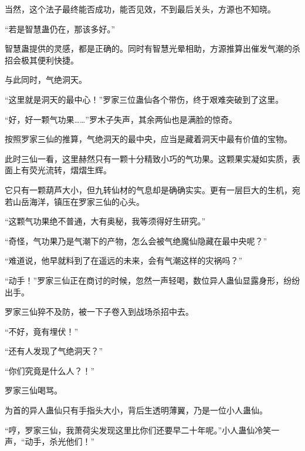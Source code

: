 \begin{this_body}
当然，这个法子最终能否成功，能否见效，不到最后关头，方源也不知晓。

“若是智慧蛊仍在，那该多好。”

智慧蛊提供的灵感，都是正确的。同时有智慧光晕相助，方源推算出催发气潮的杀招会极其便利快捷。

与此同时，气绝洞天。

“这里就是洞天的最中心！”罗家三位蛊仙各个带伤，终于艰难突破到了这里。

“好，好一颗气功果……”罗木子失声，其余两仙也是满脸的惊奇。

按照罗家三仙的推算，气绝洞天的最中央，应当是藏着洞天中最有价值的宝物。

此时三仙一看，这里赫然只有一颗十分精致小巧的气功果。这颗果实凝如实质，表面上有荧光流转，熠熠生辉。

它只有一颗葫芦大小，但九转仙材的气息却是确确实实。更有一层巨大的生机，宛若山岳海洋，镇压在罗家三仙的心头。

“这颗气功果绝不普通，大有奥秘，我等须得好生研究。”

“奇怪，气功果乃是气潮下的产物，怎么会被气绝魔仙隐藏在最中央呢？”

“难道说，他早就料到了在遥远的未来，会有气潮这样的灾祸吗？”

“动手！”罗家三仙正在商讨的时候，忽然一声轻喝，数位异人蛊仙显露身形，纷纷出手。

罗家三仙猝不及防，被一下子卷入到战场杀招中去。

“不好，竟有埋伏！”

“还有人发现了气绝洞天？”

“你们究竟是什么人？！”

罗家三仙喝骂。

为首的异人蛊仙只有手指头大小，背后生透明薄翼，乃是一位小人蛊仙。

“哼，罗家三仙，我萧荷尖发现这里比你们还要早二十年呢。”小人蛊仙冷笑一声，“动手，杀光他们！”

\end{this_body}

